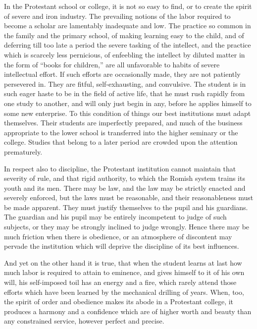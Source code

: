\documentclass[]{book}
\begin{document}
In the Protestant school or college, it is not so easy to find, or to create the spirit of severe and iron industry. The prevailing notions of the labor required to become a scholar are lamentably inadequate and low. The practice so common in the family and the primary school, of making learning easy to the child, and of deferring till too late a period the severe tasking of the intellect, and the practice which is scarcely less pernicious, of enfeebling the intellect by diluted matter in the form of ``books for children,'' are all unfavorable to habits of severe intellectual effort. If such efforts are occasionally made, they are not patiently persevered in. They are fitful, self-exhausting, and convulsive. The student is in such eager haste to be in the field of active life, that he must rush rapidly from one study to another, and will only just begin in any, before he applies himself to some new enterprise. To this condition of things our best institutions must adapt themselves. Their students are imperfectly prepared, and much of the business appropriate to the lower school is transferred into the higher seminary or the college. Studies that belong to a later period are crowded upon the attention prematurely.

In respect also to discipline, the Protestant institution cannot maintain that severity of rule, and that rigid authority, to which the Romish system trains its youth and its men. There may be law, and the law may be strictly enacted and severely enforced, but the laws must be reasonable, and their reasonableness must be made apparent. They must justify themselves to the pupil and his guardians. The guardian and his pupil may be entirely incompetent to judge of such subjects, or they may be strongly inclined to judge wrongly. Hence there may be much friction when there is obedience, or an atmosphere of discontent may pervade the institution which will deprive the discipline of its best influences.

And yet on the other hand it is true, that when the student learns at last how much labor is required to attain to eminence, and gives himself to it of his own will, his self-imposed toil has an energy and a fire, which rarely attend those efforts which have been learned by the mechanical drilling of years. When, too, the spirit of order and obedience makes its abode in a Protestant college, it produces a harmony and a confidence which are of higher worth and beauty than any constrained service, however perfect and precise.
\end{document}
